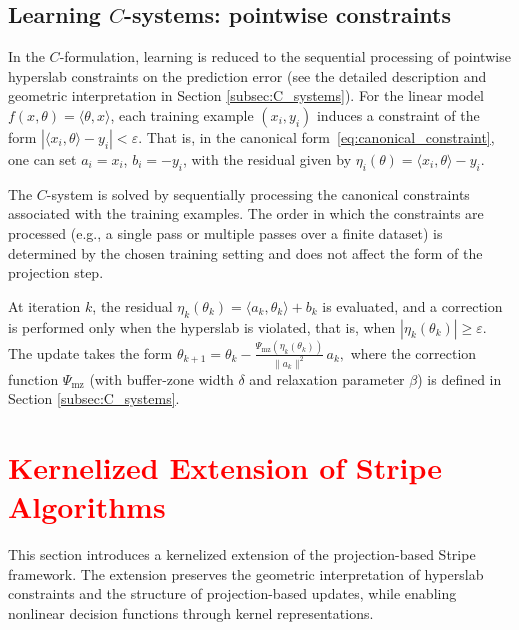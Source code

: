 \documentclass[a4paper,fleqn]{cas-sc}
\begin{document}
\subsection{Learning $C$-systems: pointwise constraints}
\label{sec:c_application}

In the $C$-formulation, learning is reduced to the sequential processing
of pointwise hyperslab constraints on the prediction error
(see the detailed description and geometric interpretation
in Section \ref{subsec:C_systems}).
For the linear model $f(x,\theta)=\langle\theta,x\rangle$,
each training example $(x_i,y_i)$ induces a constraint of the form
$
|\langle x_i,\theta\rangle - y_i| < \varepsilon.
$
That is, in the canonical form~\eqref{eq:canonical_constraint},
one can set $a_i = x_i$, $b_i = -y_i$,
with the residual given by
$
\eta_i(\theta)=\langle x_i,\theta\rangle - y_i.
$

The $C$-system is solved by sequentially processing
the canonical constraints associated with the training examples.
The order in which the constraints are processed
(e.g., a single pass or multiple passes over a finite dataset)
is determined by the chosen training setting
and does not affect the form of the projection step.


At iteration $k$, the residual
$
\eta_k(\theta_k) = \langle a_k,\theta_k\rangle + b_k
$
is evaluated, and a correction is performed only when the hyperslab is violated,
that is, when $|\eta_k(\theta_k)|\ge\varepsilon$.
The update takes the form
$
\theta_{k+1}
=
\theta_k
-
\frac{\Psi_{\mathrm{mz}}(\eta_k(\theta_k))}{\|a_k\|^2}\,a_k,
$
where the correction function $\Psi_{\mathrm{mz}}$
(with buffer-zone width $\delta$ and relaxation parameter $\beta$)
is defined in Section \ref{subsec:C_systems}.


\section{\textcolor{red}{Kernelized Extension of Stripe Algorithms}}
\label{sec:kernel_methods_sec}

This section introduces a kernelized extension of the projection-based Stripe framework.
The extension preserves the geometric interpretation of hyperslab constraints
and the structure of projection-based updates,
while enabling nonlinear decision functions through kernel representations.
\end{document}
